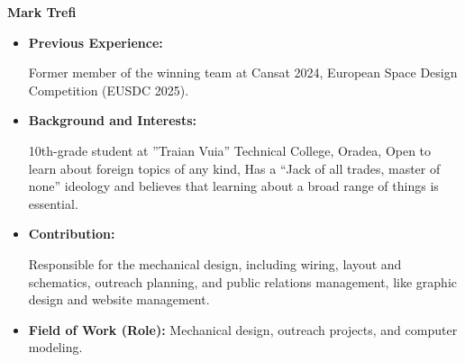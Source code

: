 \item[] \textbf{Mark Trefi}
    \begin{itemize}[label=]
        \item[\faCogs] \textbf{Previous Experience:} 
            \begin{itemize}[label=\textbullet]
                \myitemtwo Former member of the winning team at Cansat 2024,
                \myitemtwo European Space Design Competition (EUSDC 2025).
            \end{itemize}
        \item[\faGraduationCap] \textbf{Background and Interests:} 
            \begin{itemize}[label=\textbullet]
                \myitemtwo 10th-grade student at ”Traian Vuia” Technical College, Oradea,
                \myitemtwo Open to learn about foreign topics of any kind,
                \myitemtwo Has a “Jack of all trades, master of none” ideology and believes that learning about a broad range of things is essential.
            \end{itemize}
        \item[\faEdit] \textbf{Contribution:} 
            \begin{itemize}[label=\textbullet]
                \myitemtwo Responsible for the mechanical design, including wiring, layout and schematics, outreach planning, and public relations management, like graphic design and website management. 
            \end{itemize}
        \item[\faMicroscope] \textbf{Field of Work (Role):} Mechanical design, outreach projects, and computer modeling.
    \end{itemize}
    \vspace{0.2 cm}